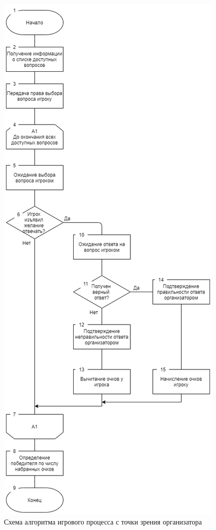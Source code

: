 \begin{figure}
\centering
	\includegraphics[scale=0.5]{attachments/game_organizer_alg.png}
	\caption{Схема алгоритма игрового процесса с точки зрения организатора}
	\label{fig:domain:model:game:organizer_alg}
\end{figure}

